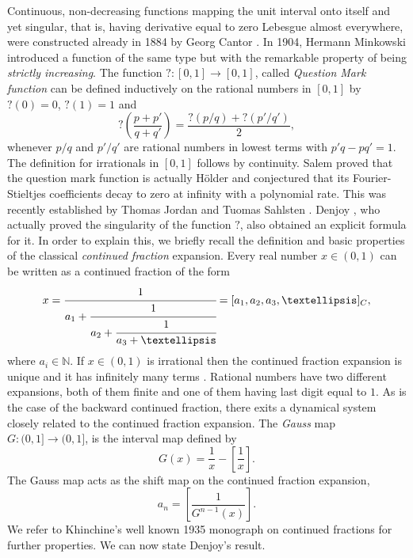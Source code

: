 \documentclass[letterpaper,10pt,reqno]{amsart}
\numberwithin{equation}{section}     %
\begin{document}
Continuous, non-decreasing functions mapping the unit interval onto itself and yet singular, that is, having derivative equal to zero Lebesgue almost everywhere, were constructed already in 1884 by Georg Cantor \cite{c}.  In 1904, Hermann Minkowski \cite{m} introduced a function of the same type but with the remarkable property of being  \emph{strictly increasing}. The function $?:[0,1] \to [0,1]$, called \emph{Question Mark function} can be defined inductively on the rational numbers in $[0,1]$  by $?(0)=0$, $?(1)=1$ and
\begin{equation*}
? \left( \frac{p+p'}{q+q'}	\right)= \frac{?(p/q)+ ?(p'/q')}{2}, 
\end{equation*}
whenever $p/q$ and $p'/q'$ are rational numbers in lowest terms with $p'q-pq'=1$. The definition for irrationals in $[0,1]$ follows by continuity. Salem \cite{s}  proved that the question mark function is actually H\"older and conjectured that its Fourier-Stieltjes  coefficients decay to zero at infinity with a polynomial rate. This was recently established by Thomas Jordan and Tuomas Sahlsten \cite{js}. Denjoy \cite{d1,d2}, who actually proved the singularity of the function $?$, also obtained an explicit formula for it. In order to explain this, we briefly recall the definition and basic properties of the classical  \emph{continued fraction} expansion. Every real number $ x \in (0,1)$  can be written as a continued fraction of the form
\begin{equation*}
x = \textrm{ } \cfrac{1}{a_1 + \cfrac{1}{a_2 + \cfrac{1}{a_3 + \dots}}} = \textrm{ } [a_1, a_2, a_3, \dots]_C,
\end{equation*}
where $a_i \in \mathbb{N}$. If $x \in (0,1)$ is irrational then the continued fraction expansion is unique and it has infinitely many terms \cite[Theorem 170]{hw}. Rational numbers have two different expansions, both of them finite and one of them having last digit equal to $1$. As is the case of the backward continued fraction, there exits a dynamical system closely related to the continued fraction expansion. The \emph{Gauss} map  $G :(0,1] \to (0,1]$, is the interval map defined by 
\begin{equation*}
G(x)= \frac{1}{x} -\left[ \frac{1}{x} \right].
\end{equation*}
The Gauss map acts as the shift map on the continued fraction expansion,
\begin{equation*}
 a_n = \left[\frac{1}{G^{n-1}(x)} \right].
\end{equation*} 
We refer to  Khinchine's  well known 1935 monograph on continued fractions \cite{kh} for further properties. We can now state Denjoy's result.
\end{document}
